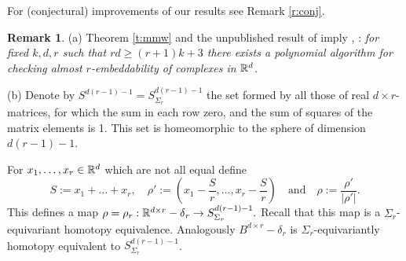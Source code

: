 \documentclass[12pt]{article}
\newcommand{\jonly}[1]{}
\newcommand{\aronly}[1]{#1}
\def\diag{\delta}
\def\pii{\rho}
\theoremstyle{plain}
\theoremstyle{definition}
\newtheorem{Remark}[Theorem]{Remark}
\begin{document}
For (conjectural) improvements of our results see \aronly{Remark \ref{r:conj}.}\jonly{\cite[Remark 4.3]{Sk17}.}

\begin{Remark}\label{r:sphere} (a) Theorem \ref{t:mmw} and the unpublished result \cite[Theorem 4]{MW16} of \cite{FV21} imply \cite[Corollary 5]{MW16}, \cite[Theorem 1.6]{FV21}: {\it for fixed $k,d,r$ such that $rd\ge(r+1)k+3$ there exists a polynomial algorithm for checking almost $r$-embeddability of complexes in ${\mathbb R}^d$.}

(b) Denote by $S^{d(r-1)-1}=S^{d(r-1)-1}_{\Sigma_r}$ the set formed by all those of real $d\times r$-matrices, for which the sum in each row zero, and the sum of squares of the matrix elements is 1.
This set is homeomorphic to the sphere of dimension $d(r-1)-1$.

For $x_1,\ldots,x_r\in{\mathbb R}^d$ which are not all equal define
$$
S:=x_1+\ldots+x_r,\quad \pii':=\left(x_1-\frac Sr,\ldots,x_r-\frac Sr\right)
\quad\text{and}\quad \pii:=\frac{\pii'}{|\pii'|}.
$$
This defines a map $\pii=\pii_r:\R^{d\times r}-\diag\phantom{}_r\to S^{d(r-1)-1}_{\Sigma_r}.$
Recall that this map is a $\Sigma_r$-equivariant homotopy equivalence.
Analogously $B^{d\times r}-\diag_r$ is
$\Sigma_r$-equivariantly homotopy equivalent to $S^{d(r-1)-1}_{\Sigma_r}$.
\end{Remark}
\end{document}
